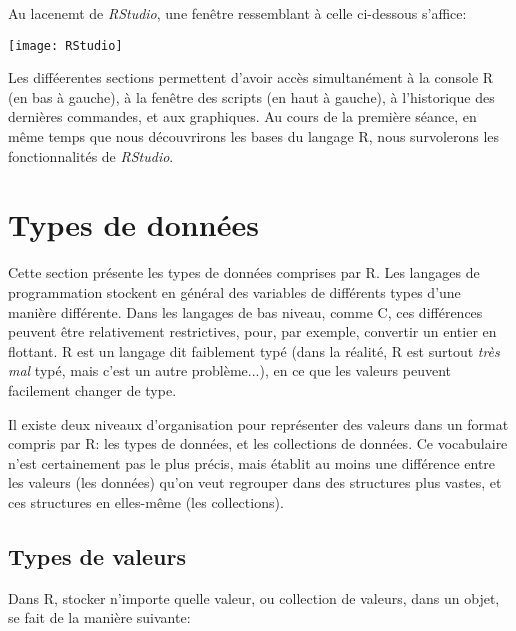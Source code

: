 Au lacenemt de \emph{RStudio}, une fenêtre ressemblant à celle ci-dessous s'affice:

\begin{center}
\texttt{[image: RStudio]}
\end{center}

Les difféerentes sections permettent d'avoir accès simultanément à la console R (en bas à gauche), à la fenêtre des scripts (en haut à gauche), à l'historique des dernières commandes, et aux graphiques.
Au cours de la première séance, en même temps que nous découvrirons les bases du langage R, nous survolerons les fonctionnalités de \emph{RStudio}. 

\section{Types de données}

Cette section présente les types de données comprises par R.
Les langages de programmation stockent en général des variables de différents types d'une manière différente.
Dans les langages de bas niveau, comme C, ces différences peuvent être relativement restrictives, pour, par exemple, convertir un entier en flottant.
R est un langage dit faiblement typé (dans la réalité, R est surtout \emph{très mal} typé, mais c'est un autre problème...), en ce que les valeurs peuvent facilement changer de type.


Il existe deux niveaux d'organisation pour représenter des valeurs dans un format compris par R: les types de données, et les collections de données.
Ce vocabulaire n'est certainement pas le plus précis, mais établit au moins une différence entre les valeurs (les données) qu'on veut regrouper dans des structures plus vastes, et ces structures en elles-même (les collections).

\subsection{Types de valeurs}

Dans R, stocker n'importe quelle valeur, ou collection de valeurs, dans un objet, se fait de la manière suivante:

\begin{knitrout}
\color{fgcolor}\begin{kframe}
\begin{flushleft}
\ttfamily\noindent
{}\hlassignement{\usebox{\hlnormalsizeboxlessthan}-}{\ }\mbox{}
\normalfont
\end{flushleft}
\end{kframe}
\end{knitrout}


